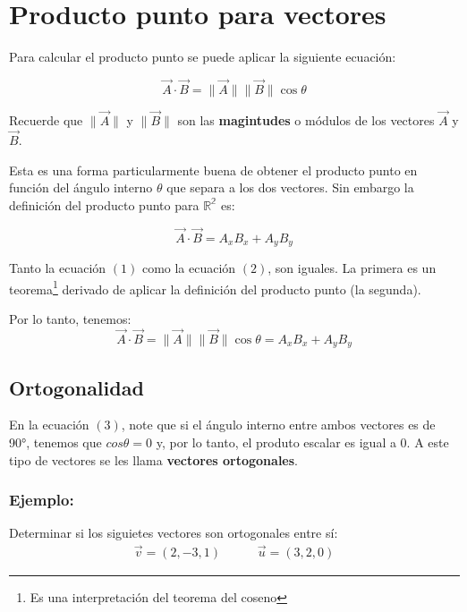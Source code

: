 \documentclass{article}
\begin{document}
\section{Producto punto para vectores}

    Para calcular el producto punto se puede aplicar la siguiente ecuación:

    \begin{equation}
        \vec{A} \cdot \vec{B} = \parallel\vec{A}\parallel \parallel\vec{B}\parallel \cos \theta
    \end{equation}

    Recuerde que $\parallel\vec{A}\parallel$ y $\parallel\vec{B}\parallel$ son las \textbf{magintudes} o módulos de los vectores $\vec{A}$ y $\vec{B}$.

    Esta es una forma particularmente buena de obtener el producto punto en función del ángulo interno $\theta$ que separa a los dos vectores. Sin embargo la definición del producto punto para $\mathbb{R^2}$ es:

    \begin{equation}
        \vec{A} \cdot \vec{B} = A_xB_x + A_yB_y
    \end{equation}

    Tanto la ecuación $(1)$ como la ecuación $(2)$, son iguales. La primera es un teorema\footnote{Es una interpretación del teorema del coseno} derivado de aplicar la definición del producto punto (la segunda).

    Por lo tanto, tenemos: 
    \begin{equation}
        \vec{A} \cdot \vec{B} = \parallel\vec{A}\parallel \parallel\vec{B}\parallel \cos \theta = A_xB_x + A_yB_y
    \end{equation}
    
    \subsection{Ortogonalidad}
    
        En la ecuación $(3)$, note que si el ángulo interno entre ambos vectores es de 90°, tenemos que $cos \theta = 0$ y, por lo tanto, el produto escalar es igual a $0$. A este tipo de vectores se les llama \textbf{vectores ortogonales}.

        \subsubsection*{Ejemplo:}

            Determinar si los siguietes vectores son ortogonales entre sí:
            \begin{gather*}
                \vec{v}=(2,-3,1) \hspace{35pt} \vec{u}=(3,2,0)
            \end{gather*}
\end{document}
